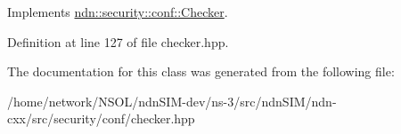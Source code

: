 Implements \hyperlink{classndn_1_1security_1_1conf_1_1Checker_ad2b264b924798134a3b1aafee06ad8de}{ndn\+::security\+::conf\+::\+Checker}.



Definition at line 127 of file checker.\+hpp.



The documentation for this class was generated from the following file\+:\begin{DoxyCompactItemize}
\item 
/home/network/\+N\+S\+O\+L/ndn\+S\+I\+M-\/dev/ns-\/3/src/ndn\+S\+I\+M/ndn-\/cxx/src/security/conf/checker.\+hpp\end{DoxyCompactItemize}
